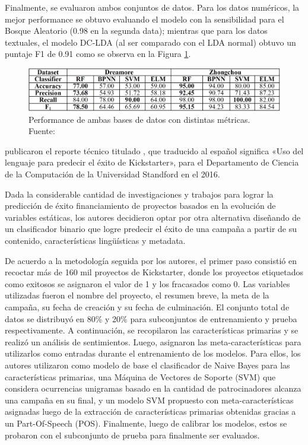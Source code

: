 Finalmente, se evaluaron ambos conjuntos de datos. Para los datos numéricos, la mejor performance se obtuvo evaluando el modelo con la sensibilidad para el Bosque Aleatorio (0.98 en la segunda data); mientras que para los datos textuales, el modelo DC-LDA (al ser comparado con el LDA normal) obtuvo un puntaje F1 de 0.91 como se observa en la Figura \ref{2:fig118}.

\begin{figure}[!ht]
	\begin{center}
		\includegraphics[width=1\textwidth]{2/figures/yuan2016b.jpg}
		\caption[Performance de ambas bases de datos con distintas métricas]{Performance de ambas bases de datos con distintas métricas.\\
			Fuente: \cite{pr_yuan2016textanalytics}}
		\label{2:fig118}
	\end{center}
\end{figure}

\clearpage
\cite{pr_sawhney2016usingLT} publicaron el reporte técnico titulado , que traducido al español significa «Uso del lenguaje para predecir el éxito de Kickstarter», para el Departamento de Ciencia de la Computación de la Universidad Standford en el 2016.

Dada la considerable cantidad de investigaciones y trabajos para lograr la predicción de éxito financiamiento de proyectos basados en la evolución de variables estáticas, los autores decidieron optar por otra alternativa diseñando de un clasificador binario que logre predecir el éxito de una campaña a partir de su contenido, características lingüísticas y metadata.

De acuerdo a la metodología seguida por los autores, el primer paso consistió en recoctar más de 160 mil proyectos de Kickstarter, donde los proyectos etiquetados como exitosos se asignaron el valor de 1 y los fracasados como 0. Las variables utilizadas fueron el nombre del proyecto, el resumen breve, la meta de la campaña, su fecha de creación y su fecha de culminación. El conjunto total de datos se distribuyó en 80\% y 20\% para subconjuntos de entrenamiento y prueba respectivamente. A continuación, se recopilaron las características primarias y se realizó un análisis de sentimientos. Luego, asignaron las meta-características para utilizarlos como entradas durante el entrenamiento de los modelos. Para ellos, los autores utilizaron como modelo de base el clasificador de Naive Bayes para las características primarias, una Máquina de Vectores de Soporte (SVM) que considera ocurrencias unigramas basado en la cantidad de patrocinadores alcanza una campaña en su final, y un modelo SVM propuesto con meta-características asignadas luego de la extracción de características primarias obtenidas gracias a un Part-Of-Speech (POS). Finalmente, luego de calibrar los modelos, estos se probaron con el subconjunto de prueba para finalmente ser evaluados.

